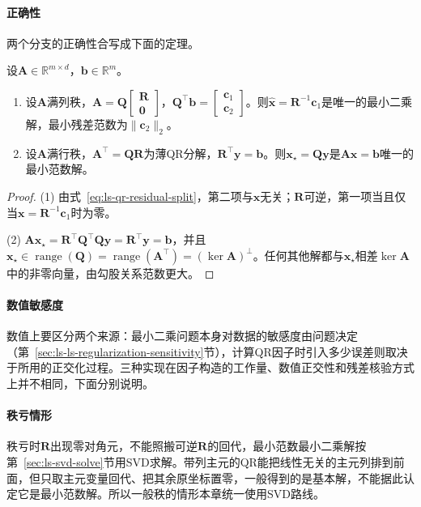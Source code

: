 \paragraph{正确性}
两个分支的正确性合写成下面的定理。

\begin{theorem}[QR给出最小二乘解与最小范数解]
\label{thm:ls-qr-least-squares}
设$\bm A\in\mathbb R^{m\times d}$，$\bm b\in\mathbb R^m$。
\begin{enumerate}
 \item 设$\bm A$满列秩，$\bm A=\bm Q\left[\begin{smallmatrix}\bm R\\\bm0\end{smallmatrix}\right]$，$\bm Q^\top\bm b=\left[\begin{smallmatrix}\bm c_1\\\bm c_2\end{smallmatrix}\right]$。则$\hat{\bm x}=\bm R^{-1}\bm c_1$是唯一的最小二乘解，最小残差范数为$\lVert\bm c_2\rVert_2$。
 \item 设$\bm A$满行秩，$\bm A^\top=\bm Q\bm R$为薄QR分解，$\bm R^\top\bm y=\bm b$。则$\bm x_\star=\bm Q\bm y$是$\bm A\bm x=\bm b$唯一的最小范数解。
\end{enumerate}
\end{theorem}
\begin{proof}
(1) 由式~\eqref{eq:ls-qr-residual-split}，第二项与$\bm x$无关；$\bm R$可逆，第一项当且仅当$\bm x=\bm R^{-1}\bm c_1$时为零。

(2) $\bm A\bm x_\star=\bm R^\top\bm Q^\top\bm Q\bm y=\bm R^\top\bm y=\bm b$，并且$\bm x_\star\in\operatorname{range}(\bm Q)=\operatorname{range}(\bm A^\top)=(\ker\bm A)^\perp$。任何其他解都与$\bm x_\star$相差$\ker\bm A$中的非零向量，由勾股关系范数更大。
\end{proof}

\paragraph{数值敏感度}
数值上要区分两个来源：最小二乘问题本身对数据的敏感度由问题决定（第~\ref{sec:ls-ls-regularization-sensitivity}节），计算QR因子时引入多少误差则取决于所用的正交化过程。三种实现在因子构造的工作量、数值正交性和残差核验方式上并不相同，下面分别说明。

\paragraph{秩亏情形}
秩亏时$\bm R$出现零对角元，不能照搬可逆$\bm R$的回代，最小范数最小二乘解按第~\ref{sec:ls-svd-solve}节用SVD求解。带列主元的QR能把线性无关的主元列排到前面，但只取主元变量回代、把其余原坐标置零，一般得到的是基本解，不能据此认定它是最小范数解。所以一般秩的情形本章统一使用SVD路线。


